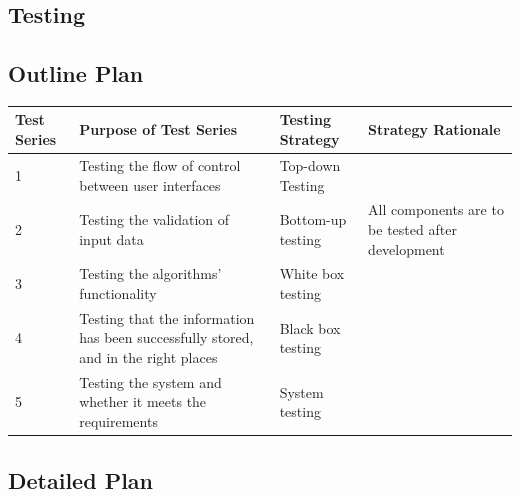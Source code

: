 \begin{landscape}

\section{Testing}

\subsection{Outline Plan}

\begin{center}
    \begin{tabular}{|p{2cm}|p{5cm}|p{5cm}|p{4cm}|}
        \hline
        \textbf{Test Series} & \textbf{Purpose of Test Series} & \textbf{Testing Strategy} & \textbf{Strategy Rationale}\\ \hline
        1 & Testing the flow of control between user interfaces & Top-down Testing & \\ \hline
        2 & Testing the validation of input data & Bottom-up testing & All components are to be tested after development \\ \hline
        3 & Testing the algorithms' functionality & White box testing & \\ \hline
        4 & Testing that the information has been successfully stored, and in the right places & Black box testing & \\ \hline
        5 & Testing the system and whether it meets the requirements & System testing & \\ \hline
    \end{tabular}
\end{center}

\subsection{Detailed Plan}


\end{landscape}
